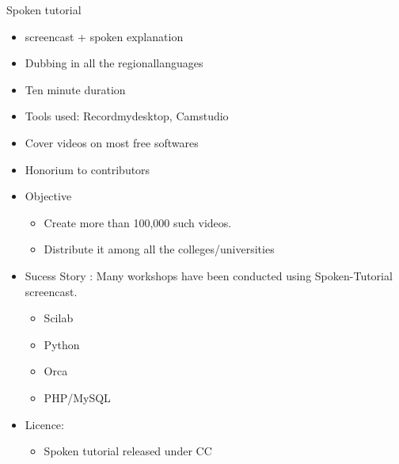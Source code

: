 \documentclass{beamer}
\begin{document}
   \begin{frame}{Spoken tutorial}
       \begin{itemize}[<+->]
           \item screencast + spoken explanation 
            \item Dubbing in all the regionallanguages
            \item Ten minute duration
            \item Tools used: Recordmydesktop, Camstudio
            \item Cover videos on most free softwares
             \item Honorium to contributors
              \item Objective
                    \begin{itemize}
                           \item Create more than 100,000 such videos.
                           \item Distribute it among all the colleges/universities
                     \end{itemize} 
              \item Sucess Story : Many workshops have been conducted using Spoken-Tutorial screencast.
                       \begin{itemize}
                              \item Scilab
                              \item Python
                               \item Orca
                               \item PHP/MySQL

                        \end{itemize}
                        \item Licence:
                           \begin{itemize}
                                \item Spoken tutorial released under CC
                            \end{itemize}
                           

       \end{itemize}
    \end{frame}
\end{document}
